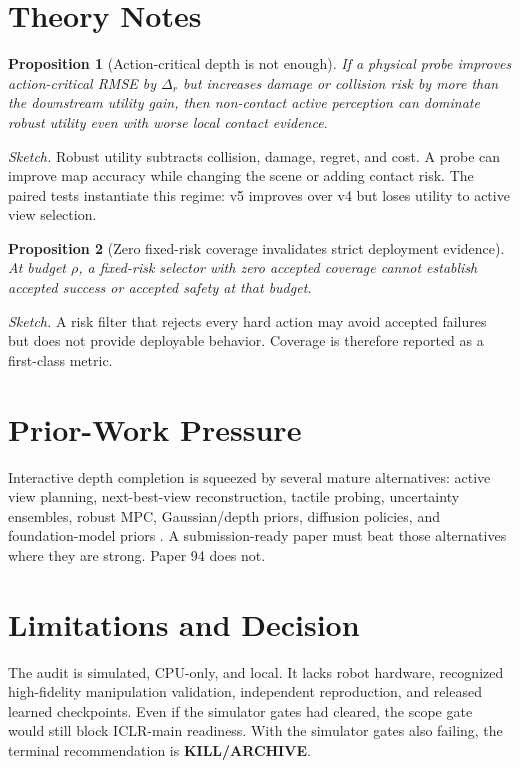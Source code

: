 \documentclass{article}
\newtheorem{proposition}{Proposition}
\newcommand{\terminal}{\textsc{KILL/ARCHIVE}}
\begin{document}
\section{Theory Notes}
\begin{proposition}[Action-critical depth is not enough]
If a physical probe improves action-critical RMSE by $\Delta_r$ but increases damage or collision risk by more than the downstream utility gain, then non-contact active perception can dominate robust utility even with worse local contact evidence.
\end{proposition}

\noindent\textit{Sketch.} Robust utility subtracts collision, damage, regret, and cost. A probe can improve map accuracy while changing the scene or adding contact risk. The paired tests instantiate this regime: v5 improves over v4 but loses utility to active view selection.

\begin{proposition}[Zero fixed-risk coverage invalidates strict deployment evidence]
At budget $\rho$, a fixed-risk selector with zero accepted coverage cannot establish accepted success or accepted safety at that budget.
\end{proposition}

\noindent\textit{Sketch.} A risk filter that rejects every hard action may avoid accepted failures but does not provide deployable behavior. Coverage is therefore reported as a first-class metric.

\section{Prior-Work Pressure}
Interactive depth completion is squeezed by several mature alternatives: active view planning, next-best-view reconstruction, tactile probing, uncertainty ensembles, robust MPC, Gaussian/depth priors, diffusion policies, and foundation-model priors \citep{r101109icra20126225245,r103389fnbot201900053,r260520566v1,r103390s20030722,r103389frobt20241172105,r260114492v2,r101016jmechmachtheory2022104966,r101109icra48891202310161431,r101109tro20172721939,r240914615v3,r101364ol586431,r106328230509262ijaidsmlv7i1p150}. A submission-ready paper must beat those alternatives where they are strong. Paper 94 does not.

\section{Limitations and Decision}
The audit is simulated, CPU-only, and local. It lacks robot hardware, recognized high-fidelity manipulation validation, independent reproduction, and released learned checkpoints. Even if the simulator gates had cleared, the scope gate would still block ICLR-main readiness. With the simulator gates also failing, the terminal recommendation is \textbf{\terminal}.
\end{document}
